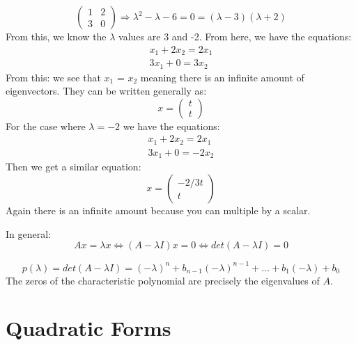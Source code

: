 \documentclass[11pt,fleqn]{book} %
\begin{document}
\begin{example}
	\begin{equation*}
		\begin{pmatrix}
			1 & 2 \\
			3 & 0
		\end{pmatrix} \Rightarrow \lambda^2 - \lambda - 6 = 0  = (\lambda - 3)(\lambda + 2)
	\end{equation*}
	From this, we know the $\lambda$ values are 3  and -2. From here, we have the equations:
	\begin{align*}
		x_1 + 2x_2 = 2x_1 \\
		3x_1 + 0 = 3x_2
	\end{align*}
	From this: we see that $x_1$ = $x_2$ meaning there  is an infinite amount of eigenvectors. They can be written generally as:
	\begin{equation*}
		x = \begin{pmatrix}
			t \\
			t
		\end{pmatrix}
	\end{equation*}
	For the case where $\lambda = -2$
	we have the equations:
	\begin{align*}
		x_1 + 2x_2 = 2 x_1 \\
		3x_1 + 0 = -2x_2
	\end{align*}
	Then we  get a similar equation:
	\begin{equation*}
		x = \begin{pmatrix}
			-2/3 t \\
			t
		\end{pmatrix}
	\end{equation*}
	Again there is an infinite amount because you can multiple by a scalar. 
\end{example}


In general:
\begin{equation}
	Ax = \lambda x \iff (A - \lambda I) x = 0 \iff det(A - \lambda I) = 0
\end{equation}

\begin{definition}
	\begin{equation*}
		p(\lambda)  = det(A - \lambda I) = (-\lambda)^n + b_{n-1}(-\lambda)^{n-1} + \dots + b_1 (-\lambda) + b_0
	\end{equation*}
	The zeros of the characteristic polynomial are precisely the eigenvalues of $A$. 
\end{definition}


\section{Quadratic Forms}
\end{document}
